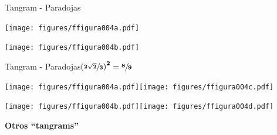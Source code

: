 \documentclass[14pt,aspectratio=169,usenames,dvipsnames]{beamer}
\begin{document}

    \begin{frame}{Tangram - Paradojas}
        \begin{center}
            \texttt{[image: figures/ffigura004a.pdf]}\;\;\qquad\; \\

            \vspace{3em}

            \texttt{[image: figures/ffigura004b.pdf]}\qquad{} \\
        \end{center}
    \end{frame}


    \begin{frame}{Tangram - Paradojas\qquad $\mathbf{\left(\sfrac{2\sqrt{2}}{3}\right)^2 = \sfrac{8}{9}}$}
        \begin{center}
            \texttt{[image: figures/ffigura004a.pdf]}\;\;\qquad\;\texttt{[image: figures/ffigura004c.pdf]} \\

            \vspace{3em}

            \texttt{[image: figures/ffigura004b.pdf]}\qquad\texttt{[image: figures/ffigura004d.pdf]} \\
        \end{center}
    \end{frame}


    \begin{frame}{}
        \begin{center}
            \textbf{\huge Otros ``tangrams''}
        \end{center}
    \end{frame}

\end{document}
